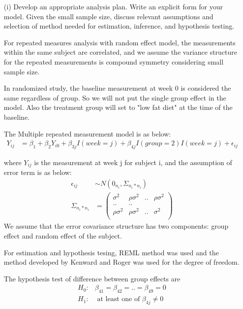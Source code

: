 \begin{itemize}
													\begin{itemize}
													\vspace{0.2cm}
													\item[(i)] Develop an appropriate analysis plan. Write an explicit form for your model.
																		 Given the small sample size, discuss relevant assumptions and selection of method needed for estimation, inference, and hypothesis testing.

For repeated measures analysis with random effect model, the measurements within the same subject are correlated, and we assume the variance structure for the repeated measurements is compound symmetry considering small sample size. 

In randomized study, the baseline measurement at week 0 is considered the same regardless of group. So we will not put the single group effect in the model. Also the treatment group will set to "low fat diet" at the time of the baseline. 

The Multiple repeated measurement model is as below:
\begin{align*}
Y_{ij} &=\beta_1 +  \beta_{2} Y_{i0}  + \beta_{3j} I(week = j) + \beta_{4j} I(group=2) I(week =j)  + \epsilon_{ij}
\end{align*}

where $Y_{ij}$ is the measurement at week j for subject i, and the assumption of error term is as below:
\begin{align*}
\epsilon_{ij} & \sim  N(0_{n_i}, \Sigma_{n_{i}*n_{i}}) \\
\Sigma_{n_{i}*n_{i}} &= \begin{pmatrix}
\sigma^2 & \rho \sigma^2 & .. & \rho \sigma^2 \\
..&.. \\
\rho \sigma^2 & \rho \sigma^2 & .. & \sigma^2 \\
\end{pmatrix}
\end{align*}
We assume that the error covariance structure has two components: group effect and random effect of the subject. 

For estimation and hypothesis tesing, REML method was used and the method developed by Kenward and Roger was used for the degree of freedom.

The hypothesis test of difference between group effects are 
\begin{align*}
H_0: & \beta_{41} = \beta_{42} = .. = \beta_{49} = 0 \\
H_1: & \text{ at least one of }\beta_{4j} \neq 0 
\end{align*}




\end{itemize}
\end{itemize}
